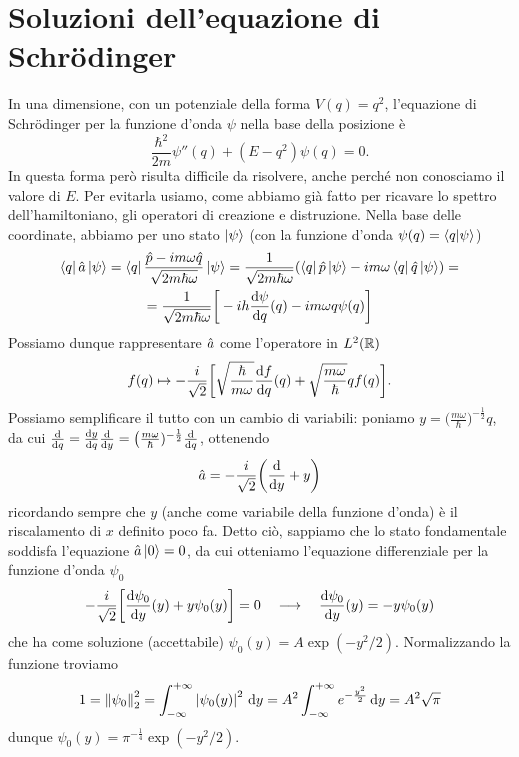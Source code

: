 \section{Soluzioni dell'equazione di Schr\"odinger}
In una dimensione, con un potenziale della forma $V(q)=q^2$, l'equazione di Schr\"odinger per la funzione d'onda $\psi$ nella base della posizione è
\begin{equation}
	\frac{\hbar^2}{2m}\psi''(q)+(E-q^2)\psi(q)=0.
	\label{eq:schrodinger-oscillatore-1d}
\end{equation}
In questa forma però risulta difficile da risolvere, anche perch\'e non conosciamo il valore di $E$.
Per evitarla usiamo, come abbiamo già fatto per ricavare lo spettro dell'hamiltoniano, gli operatori di creazione e distruzione.
Nella base delle coordinate, abbiamo per uno stato $\left|{\psi}\right\rangle$ (con la funzione d'onda $\psi(q)=\left\langle{q}\middle|{\psi}\right\rangle$)
\begin{multline}
	\left\langle{q}\right|\hat{a}\left|{\psi}\right\rangle=\left\langle{q}\right|\frac{\hat{p}-im\omega\hat{q}}{\sqrt{2m\hbar\omega}}\left|{\psi}\right\rangle=\frac1{\sqrt{2m\hbar\omega}}(\left\langle{q}\right|\hat{p}\left|{\psi}\right\rangle-im\omega\left\langle{q}\right|\hat{q}\left|{\psi}\right\rangle)=\\
	=\frac1{\sqrt{2m\hbar\omega}}\bigg[-ih\frac{\textup{d} {\psi}}{\textup{d} {q}}(q)-im\omega q\psi(q)\bigg]
\end{multline}
Possiamo dunque rappresentare $\hat{a}$ come l'operatore in $L^2(\mathbb{R})$
\begin{equation}
	f(q)\mapsto-\frac{i}{\sqrt{2}}\bigg[\sqrt{\frac{\hbar}{m\omega}}\frac{\textup{d} {f}}{\textup{d} {q}}(q)+\sqrt{\frac{m\omega}{\hbar}}qf(q)\bigg].
\end{equation}
Possiamo semplificare il tutto con un cambio di variabili: poniamo $y=\big(\frac{m\omega}{\hbar})^{-\frac12}q$, da cui $\frac{\textup{d} {}}{\textup{d} {q}}=\frac{\textup{d} {y}}{\textup{d} {q}}\frac{\textup{d} {}}{\textup{d} {y}}=\big(\frac{m\omega}{\hbar})^{-\frac12}\frac{\textup{d} {}}{\textup{d} {q}}$, ottenendo
\begin{equation}
	\hat{a}=-\frac{i}{\sqrt{2}}\bigg(\frac{\textup{d} {}}{\textup{d} {y}}+y\bigg)
\end{equation}
ricordando sempre che $y$ (anche come variabile della funzione d'onda) è il riscalamento di $x$ definito poco fa.
Detto ciò, sappiamo che lo stato fondamentale soddisfa l'equazione $\hat{a}\left|{0}\right\rangle=0$, da cui otteniamo l'equazione differenziale per la funzione d'onda $\psi_0$
\begin{equation}
	-\frac{i}{\sqrt{2}}\bigg[\frac{\textup{d} {\psi_0}}{\textup{d} {y}}(y)+y\psi_0(y)\bigg]=0\quad\longrightarrow\quad \frac{\textup{d} {\psi_0}}{\textup{d} {y}}(y)=-y\psi_0(y)
\end{equation}
che ha come soluzione (accettabile) $\psi_0(y)=A\exp(-y^2/2)$.
Normalizzando la funzione troviamo
\begin{equation}
	1=\left\|{\psi_0}\right\|_2^2=\int_{-\infty}^{+\infty}\left|{\psi_0(y)}\right|^2\,\textup{d} y=A^2\int_{-\infty}^{+\infty}e^{-\frac{y^2}2}\,\textup{d} y=A^2\sqrt{\pi}
\end{equation}
dunque $\psi_0(y)=\pi^{-\frac14}\exp(-y^2/2)$.

